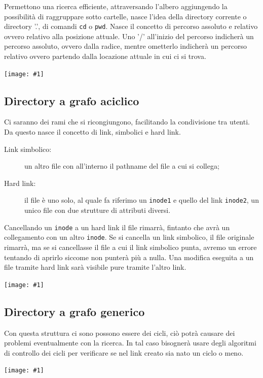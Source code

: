 \documentclass[a4paper, 12pt]{book}
\newcommand{\foto}[1]{\texttt{[image: \#1]}}
\begin{document}
Permettono una ricerca efficiente, attraversando l'albero 
aggiungendo la possibilità di raggruppare sotto cartelle,
nasce l'idea della directory corrente o directory '.', 
di comandi \verb|cd| o \verb|pwd|. Nasce il concetto di percorso 
assoluto e relativo ovvero relativo alla posizione attuale. Uno 
'/' all'inizio del percorso indicherà un percorso assoluto, ovvero 
dalla radice, mentre ometterlo indicherà un percorso relativo 
ovvero partendo dalla locazione attuale in cui ci si trova.
\begin{center}
    \foto{dir_albero.png}
\end{center}

\subsection{Directory a grafo aciclico}

Ci saranno dei rami che si ricongiungono, facilitando la condivisione 
tra utenti. Da questo nasce il concetto di link, simbolici 
e hard link. 
\begin{description}
    \item[Link simbolico:] un altro file con all'interno il pathname del file a cui si collega;
    \item[Hard link:] il file è uno solo, al quale fa riferimo un \verb|inode1| e quello del link \verb|inode2|, un unico file con due strutture di attributi diversi.  
\end{description}
Cancellando un \verb|inode| a un hard link il file rimarrà, fintanto che avrà 
un collegamento con un altro \verb|inode|. Se si cancella un 
link simbolico, il file originale rimarrà, ma se si cancellasse 
il file a cui il link simbolico punta, avremo un errore 
tentando di aprirlo siccome non punterà più a nulla.
Una modifica eseguita a un file tramite hard link sarà 
visibile pure tramite l'altro link.
\begin{center}
    \foto{dir_grafo.png}
\end{center}

\subsection{Directory a grafo generico}

Con questa struttura ci sono possono essere dei cicli, 
ciò potrà causare dei problemi eventualmente con la 
ricerca. In tal caso bisognerà usare degli algoritmi di controllo 
dei cicli per verificare se nel link creato sia nato un 
ciclo o meno.
\begin{center}
    \foto{dir_gen.png}
\end{center}
\end{document}
